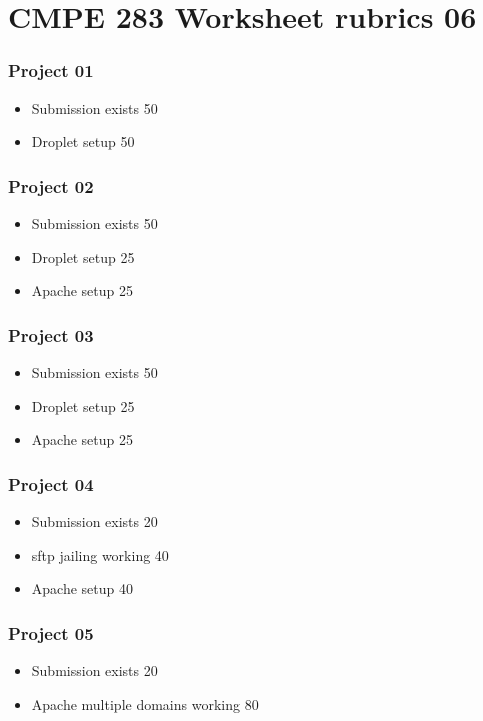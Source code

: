 \documentclass[12pt, a4paper]{article}
\begin{document}

\section*{CMPE 283 Worksheet rubrics 06}
\subsubsection*{Project 01}
\begin{itemize}
 \item Submission exists 50
 \item Droplet setup 50
\end{itemize}
 
\subsubsection*{Project 02}
\begin{itemize}
 \item Submission exists 50
 \item Droplet setup 25
 \item Apache setup 25
\end{itemize}
 
\subsubsection*{Project 03}
\begin{itemize}
 \item Submission exists 50
 \item Droplet setup 25
 \item Apache setup 25
\end{itemize}
 

\subsubsection*{Project 04}
\begin{itemize}
 \item Submission exists 20
 \item sftp jailing working 40
 \item Apache setup 40
\end{itemize}
 

\subsubsection*{Project 05}
\begin{itemize}
 \item Submission exists 20
 \item Apache multiple domains working 80
\end{itemize}
 
\end{document}
